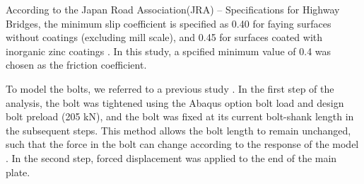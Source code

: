 According to the Japan Road Association(JRA) -- Specifications for Highway Bridges, the minimum slip coefficient is specified as 0.40 for faying surfaces without coatings (excluding mill scale), and 0.45 for surfaces coated with inorganic zinc coatings \cite{douji2017,shishin2009}. In this study, a spcified minimum value of 0.4 was chosen as the friction coefficient. \par
To model the bolts, we referred to a previous study \cite{Kim2007,hung1996,Shimozato2008ExperrimentalModel}. In the first step of the analysis, the bolt was tightened using the Abaqus option bolt load and design bolt preload (205 kN), and the bolt was fixed at its current bolt-shank length in the subsequent steps. This method allows the bolt length to remain unchanged, such that the force in the bolt can change according to the response of the model \cite{Smith2020}. In the second step, forced displacement was applied to the end of the main plate.


\begin{table}[htbp]
\caption{Material properties}
\label{tab-mateproper}
\end{table}

